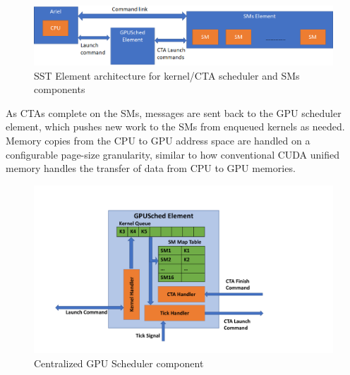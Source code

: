    \begin{figure}[!htb]
      \centering
      \setlength{\abovecaptionskip}{6pt plus 1pt minus 1pt}
      \includegraphics[width=.90\textwidth,keepaspectratio]{figures/2_1.eps}
      \captionsetup{width=.90\textwidth}
      \caption{SST Element architecture for kernel/CTA scheduler and SMs components}
      \label{fig:gpu_sched}
   \end{figure}


As CTAs complete on the SMs, messages are sent back to the GPU scheduler
element, which pushes new work to the SMs from enqueued kernels as needed.
Memory copies from the CPU to GPU address space are handled on a configurable
page-size granularity, similar to how conventional CUDA unified memory handles
the transfer of data from CPU to GPU memories.

   \begin{figure}[!htb]
      \centering
      \setlength{\abovecaptionskip}{6pt plus 1pt minus 1pt}
      \includegraphics[width=.90\textwidth,keepaspectratio]{figures/scheduler.pdf}
      \captionsetup{width=.75\textwidth}
      \caption{Centralized GPU Scheduler component}
      \label{fig:sched}
   \end{figure}

